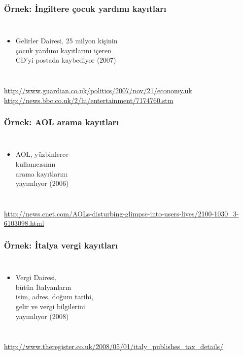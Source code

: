 \documentclass[dvipsnames]{beamer}
\theoremstyle{definition}
\theoremstyle{example}
\theoremstyle{plain}
\begin{document}
\begin{frame}
  \frametitle{Örnek: İngiltere çocuk yardımı kayıtları}

  \begin{columns}

    \begin{itemize}
      \item Gelirler Dairesi, 25 milyon kişinin\\
        çocuk yardımı kayıtlarını içeren\\
        CD'yi postada kaybediyor (2007)
    \end{itemize}
  \end{columns}

  \medskip
  \tiny{\url{http://www.guardian.co.uk/politics/2007/nov/21/economy.uk}}\\
  \tiny{\url{http://news.bbc.co.uk/2/hi/entertainment/7174760.stm}}\\
\end{frame}

\begin{frame}
  \frametitle{Örnek: AOL arama kayıtları}

  \begin{columns}

    \begin{itemize}
      \item AOL, yüzbinlerce\\
        kullanıcısının\\
        arama kayıtlarını\\
        yayımlıyor (2006)
    \end{itemize}
  \end{columns}

  \medskip
  \tiny{\url{http://news.cnet.com/AOLs-disturbing-glimpse-into-users-lives/2100-1030_3-6103098.html}}\\
\end{frame}

\begin{frame}
  \frametitle{Örnek: İtalya vergi kayıtları}

  \begin{columns}

    \begin{itemize}
      \item Vergi Dairesi,\\
        bütün İtalyanların\\
        isim, adres, doğum tarihi,\\
        gelir ve vergi bilgilerini\\
        yayımlıyor (2008)
    \end{itemize}
  \end{columns}

  \medskip
  \tiny{\url{http://www.theregister.co.uk/2008/05/01/italy_publishes_tax_details/}}\\
\end{frame}
\end{document}

